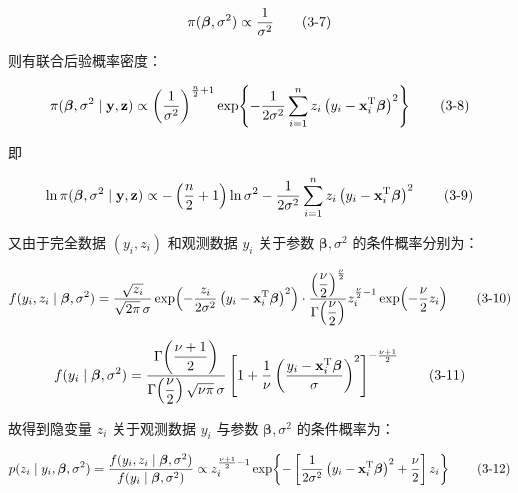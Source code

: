 \documentclass[12pt,a4paper]{ctexart}
\makeatletter
\numberwithin{figure}{section}
\numberwithin{table}{section}
\let\ltx@orig@tag\tag
\renewcommand{\tag}[1]{\refstepcounter{equation}\ltx@orig@tag{#1}}%
\makeatother
\begin{document}
\begin{equation}
\pi(\boldsymbol{\beta}, \sigma^2) \propto \frac{1}{\sigma^2} \tag{3-7}
\end{equation}

则有联合后验概率密度：

\begin{equation}
\pi(\boldsymbol{\beta}, \sigma^2 \mid \mathbf{y}, \mathbf{z}) \propto \left(\frac{1}{\sigma^2}\right)^{\frac{n}{2}+1} \exp\!\left\{-\frac{1}{2\sigma^2}\sum_{i=1}^{n} z_i\left(y_i - \mathbf{x}_i^{\mathrm{T}} \boldsymbol{\beta}\right)^2\right\} \tag{3-8}
\end{equation}

即

\begin{equation}
\ln \pi(\boldsymbol{\beta}, \sigma^2 \mid \mathbf{y}, \mathbf{z}) \propto -\left(\frac{n}{2}+1\right)\ln \sigma^2 - \frac{1}{2\sigma^2}\sum_{i=1}^{n} z_i\left(y_i - \mathbf{x}_i^{\mathrm{T}} \boldsymbol{\beta}\right)^2 \tag{3-9}
\end{equation}

又由于完全数据 $(y_i, z_i)$ 和观测数据 $y_i$ 关于参数 $\boldsymbol{\beta}, \sigma^2$ 的条件概率分别为：

\begin{equation}
f(y_i, z_i \mid \boldsymbol{\beta}, \sigma^2) = \frac{\sqrt{z_i}}{\sqrt{2\pi}\,\sigma} \exp\!\left(-\frac{z_i}{2\sigma^2}\left(y_i - \mathbf{x}_i^{\mathrm{T}} \boldsymbol{\beta}\right)^2\right) \cdot \frac{\left(\dfrac{\nu}{2}\right)^{\frac{\nu}{2}}}{\Gamma\!\left(\dfrac{\nu}{2}\right)} z_i^{\frac{\nu}{2}-1} \exp\!\left(-\frac{\nu}{2} z_i\right) \tag{3-10}
\end{equation}

\begin{equation}
f(y_i \mid \boldsymbol{\beta}, \sigma^2) = \frac{\Gamma\!\left(\dfrac{\nu+1}{2}\right)}{\Gamma\!\left(\dfrac{\nu}{2}\right)\sqrt{\nu\pi}\,\sigma} \left[1 + \frac{1}{\nu}\left(\frac{y_i - \mathbf{x}_i^{\mathrm{T}} \boldsymbol{\beta}}{\sigma}\right)^2\right]^{-\frac{\nu+1}{2}} \tag{3-11}
\end{equation}

故得到隐变量 $z_i$ 关于观测数据 $y_i$ 与参数 $\boldsymbol{\beta}, \sigma^2$ 的条件概率为：

\begin{equation}
p(z_i \mid y_i, \boldsymbol{\beta}, \sigma^2) = \frac{f(y_i, z_i \mid \boldsymbol{\beta}, \sigma^2)}{f(y_i \mid \boldsymbol{\beta}, \sigma^2)} \propto z_i^{\frac{\nu+1}{2}-1} \exp\!\left\{-\left[\frac{1}{2\sigma^2}\left(y_i - \mathbf{x}_i^{\mathrm{T}} \boldsymbol{\beta}\right)^2 + \frac{\nu}{2}\right] z_i\right\} \tag{3-12}
\end{equation}
\end{document}
